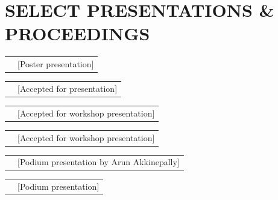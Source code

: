 \documentclass[11pt,letter,sans]{moderncv}
\makeatletter
\renewcommand*{\cvitem}[3][6pt]{%
	\begin{tabular}{@{}p{\hintscolumnwidth}@{\hspace{\separatorcolumnwidth}}p{\maincolumnwidth}@{}}%
		\raggedleft\hintstyle{#2} &{#3}%
	\end{tabular}%
	\par\addvspace{#1}}
\let\oldsection\section%
\renewcommand{\section}[1]{\leavevmode\unskip\vspace*{-\baselineskip}\oldsection{#1}}%
\newcommand{\refno}[1]{}
\makeatother
\begin{document}
	
	\section{SELECT PRESENTATIONS \& PROCEEDINGS}
	
	\cvitem{2019\refno{Fournier2019isttt}}{\hspace{0em}\bibentry{Fournier2019isttt} [Poster presentation]}
	\cvitem{\refno{Fournier2019ieee}}{\hspace{0em}\bibentry{Fournier2019ieee} [Accepted for presentation]}
	\cvitem{\refno{Currie2019thredbodrt}}{\hspace{0em}\bibentry{Currie2019thredbodrt} [Accepted for workshop presentation]}
	\cvitem{\refno{Currie2019thredboamenity}}{\hspace{0em}\bibentry{Currie2019thredboamenity} [Accepted for workshop presentation]}
	\cvitem{2018\refno{Fournier2018ieee}}{\hspace{0em}\bibentry{Fournier2018ieee} [Podium presentation by Arun Akkinepally]}
		
\cvitem{2017\refno{podium-naples2017}}{\hspace{0em}\bibentry{Fournier2017mt-its} [Podium presentation]}
	
	
\end{document}
